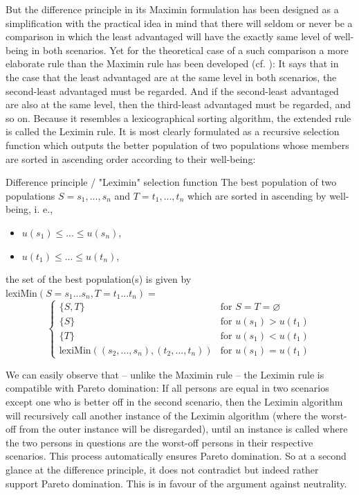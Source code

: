 But the difference principle in its Maximin formulation has been designed as a simplification with the practical idea in mind that there will seldom or never be a comparison in which the least advantaged will have the exactly same level of well-being in both scenarios. Yet for the theoretical case of a such comparison a more elaborate rule than the Maximin rule has been developed (cf. ): It says that in the case that the least advantaged are at the same level in both scenarios, the second-least advantaged must be regarded. And if the second-least advantaged are also at the same level, then the third-least advantaged must be regarded, and so on. Because it resembles a lexicographical sorting algorithm, the extended rule is called the Leximin rule. It is most clearly formulated as a recursive selection function which outputs the better population of two populations whose members are sorted in ascending order according to their well-being:  

\begin{Definition}{Difference principle / "Leximin" selection function}{}
The best population of two populations $S = s_1, ..., s_n$ and $T = t_1, ..., t_n$ which are sorted in ascending by well-being, i. e.,
\begin{itemize}
\item $u(s_1) \leq ... \leq u(s_n)$,
\item $u(t_1) \leq ... \leq u(t_n)$,
\end{itemize}
the set of the best population(s) is given by \\
lexiMin$(S=s_1...s_n, T=t_1...t_n) = $ \\
\[
  \begin{cases}
    \{S, T\} & \text{for } S = T = \varnothing \\
    \{S\} & \text{for } u(s_1) > u(t_1) \\
    \{T\} & \text{for } u(s_1) < u(t_1) \\
    \text{lexiMin}\left((s_2, ..., s_n), (t_2, ..., t_n)\right) & \text{for } u(s_1) = u(t_1)
  \end{cases}
\]
\end{Definition}

We can easily observe that – unlike the Maximin rule – the Leximin rule is compatible with Pareto domination: If all persons are equal in two scenarios except one who is better off in the second scenario, then the Leximin algorithm will recursively call another instance of the Leximin algorithm (where the worst-off from the outer instance will be disregarded), until an instance is called where the two persons in questions are the worst-off persons in their respective scenarios. This process automatically ensures Pareto domination. So at a second glance at the difference principle, it does not contradict but indeed rather support Pareto domination. This is in favour of the argument against neutrality.  

